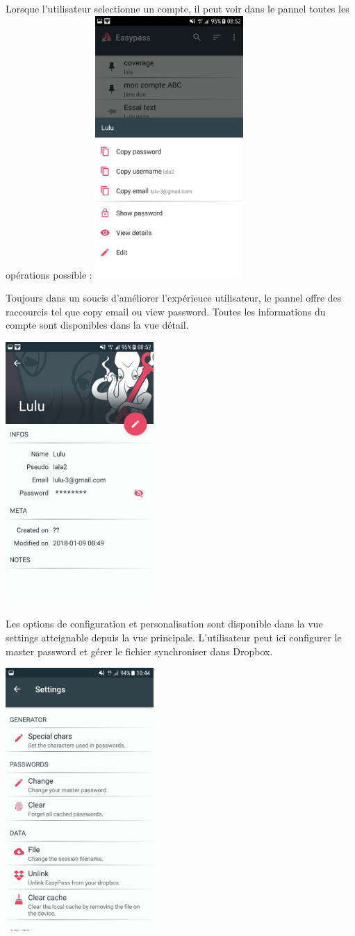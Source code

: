 Lorsque l'utilisateur selectionne un compte, il peut voir dans le pannel toutes les opérations possible : 
\includegraphics[height=10cm]{liste-edition.jpg}

Toujours dans un soucis d'améliorer l'expérieuce utilisateur, le pannel offre des raccourcis tel que copy email ou view password. Toutes les informations du compte sont disponibles dans la vue détail.

\includegraphics[height=10cm]{details.jpg}

Les options de configuration et personalisation sont disponible dans la vue settings atteignable depuis la vue principale. L'utilisateur peut ici configurer le master password et gérer le fichier synchroniser dans Dropbox.

\includegraphics[height=10cm]{settings.jpg}
